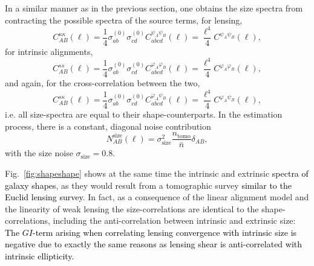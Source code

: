 \documentclass[a4paper,fleqn,usenatbib]{mnras}
\newcommand\spirou[1]{\textcolor{black}{#1}}
\newcommand\BG[1]{\textcolor{black}{#1}}
\begin{document}
In a similar manner as in the previous section, one obtains the size spectra from contracting the possible spectra of the source terms, for lensing,
\begin{equation}
C^{\kappa\kappa}_{AB}(\ell) = \frac{1}{4}\sigma^{(0)}_{ab}\sigma^{(0)}_{cd}C^{\psi_A\psi_B}_{abcd}(\ell) = \frac{\ell^4}{4}C^{\psi_A\psi_B}(\ell),
\end{equation}
for intrinsic alignments,
\begin{equation}
C^{ss}_{AB}(\ell) = \frac{1}{4}\sigma^{(0)}_{ab}\sigma^{(0)}_{cd}C^{\varphi_A\varphi_B}_{abcd}(\ell) = \frac{\ell^4}{4}C^{\varphi_A\varphi_B}(\ell),
\end{equation}
and again, for the cross-correlation between the two,
\begin{equation}
C^{s\kappa}_{AB}(\ell) = \frac{1}{4}\sigma^{(0)}_{ab}\sigma^{(0)}_{cd}C^{\varphi_A\psi_B}_{abcd}(\ell) = \frac{\ell^4}{4}C^{\varphi_A\psi_B}(\ell),
\end{equation}
i.e. all size-spectra are equal to their shape-counterparts. In the estimation process, there is a constant, diagonal noise contribution
\begin{equation}
N_{AB}^\mathrm{size}(\ell) = \sigma^2_\mathrm{size} \frac{n_\mathrm{tomo}}{\bar{n}}\delta_{AB},
\end{equation}
with the size noise $\sigma_\mathrm{size} = 0.8$.

Fig.~\ref{fig:shapeshape} shows at the same time the intrinsic and extrinsic \BG{spectra of galaxy shapes}, as they would result from a tomographic survey \spirou{similar to the Euclid lensing survey}. In fact, as a consequence of the linear alignment model and the linearity of weak lensing the size-correlations are identical to the shape-correlations, including the anti-correlation between intrinsic and extrinsic size: \spirou{The $GI$-term arising when correlating lensing convergence with intrinsic size is negative due to exactly the same reasons as lensing shear is anti-correlated with intrinsic ellipticity.} 
\end{document}
